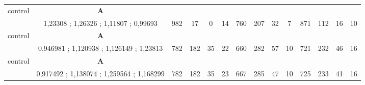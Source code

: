 \begin{table}[]
{\begin{tabular}{|c|c|c|c|c|c|c|c|c|c|c|c|c|c|}
control & \cellcolor{blue!15}\textbf{A}& {\color[HTML]{00009B} } & {\color[HTML]{9A0000} } & {\color[HTML]{009901} } &  & {\color[HTML]{00009B} } & {\color[HTML]{9A0000} } & {\color[HTML]{009901} } &  & {\color[HTML]{00009B} } & {\color[HTML]{9A0000} } & {\color[HTML]{009901} } &  \\ 
 & \cellcolor{ blue!15}1,23308 ; 1,26326 ; 1,11807 ; 0,99693 & \multirow{-2}{*}{{\color[HTML]{00009B} 982}} & \multirow{-2}{*}{{\color[HTML]{9A0000} 17}} & \multirow{-2}{*}{{\color[HTML]{009901} 0}} & \multirow{-2}{*}{14} & \multirow{-2}{*}{{\color[HTML]{00009B} 760}} & \multirow{-2}{*}{{\color[HTML]{9A0000} 207}} & \multirow{-2}{*}{{\color[HTML]{009901} 32}} & \multirow{-2}{*}{7} & \multirow{-2}{*}{{\color[HTML]{00009B} 871}} & \multirow{-2}{*}{{\color[HTML]{9A0000} 112}} & \multirow{-2}{*}{{\color[HTML]{009901} 16}} & \multirow{-2}{*}{10} \\ \hline

control & \cellcolor{blue!15}\textbf{A}& {\color[HTML]{00009B} } & {\color[HTML]{9A0000} } & {\color[HTML]{009901} } &  & {\color[HTML]{00009B} } & {\color[HTML]{9A0000} } & {\color[HTML]{009901} } &  & {\color[HTML]{00009B} } & {\color[HTML]{9A0000} } & {\color[HTML]{009901} } &  \\ 
 & \cellcolor{ blue!15}0,946981 ; 1,120938 ; 1,126149 ; 1,23813 & \multirow{-2}{*}{{\color[HTML]{00009B} 782}} & \multirow{-2}{*}{{\color[HTML]{9A0000} 182}} & \multirow{-2}{*}{{\color[HTML]{009901} 35}} & \multirow{-2}{*}{22} & \multirow{-2}{*}{{\color[HTML]{00009B} 660}} & \multirow{-2}{*}{{\color[HTML]{9A0000} 282}} & \multirow{-2}{*}{{\color[HTML]{009901} 57}} & \multirow{-2}{*}{10} & \multirow{-2}{*}{{\color[HTML]{00009B} 721}} & \multirow{-2}{*}{{\color[HTML]{9A0000} 232}} & \multirow{-2}{*}{{\color[HTML]{009901} 46}} & \multirow{-2}{*}{16} \\ \hline

control & \cellcolor{blue!15}\textbf{A}& {\color[HTML]{00009B} } & {\color[HTML]{9A0000} } & {\color[HTML]{009901} } &  & {\color[HTML]{00009B} } & {\color[HTML]{9A0000} } & {\color[HTML]{009901} } &  & {\color[HTML]{00009B} } & {\color[HTML]{9A0000} } & {\color[HTML]{009901} } &  \\ 
 & \cellcolor{ blue!15}0,917492 ; 1,138074 ; 1,259564 ; 1,168299 & \multirow{-2}{*}{{\color[HTML]{00009B} 782}} & \multirow{-2}{*}{{\color[HTML]{9A0000} 182}} & \multirow{-2}{*}{{\color[HTML]{009901} 35}} & \multirow{-2}{*}{23} & \multirow{-2}{*}{{\color[HTML]{00009B} 667}} & \multirow{-2}{*}{{\color[HTML]{9A0000} 285}} & \multirow{-2}{*}{{\color[HTML]{009901} 47}} & \multirow{-2}{*}{10} & \multirow{-2}{*}{{\color[HTML]{00009B} 725}} & \multirow{-2}{*}{{\color[HTML]{9A0000} 233}} & \multirow{-2}{*}{{\color[HTML]{009901} 41}} & \multirow{-2}{*}{16} \\ \hline



\end{tabular}}
\end{table}
